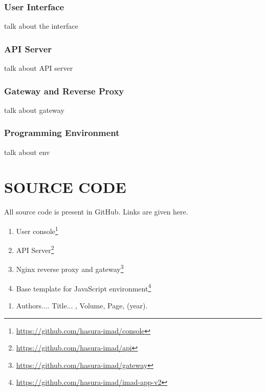 \documentclass[DD]{iitmdiss}
\begin{document}
\subsection{User Interface}
talk about the interface
\subsection{API Server}
talk about API server
\subsection{Gateway and Reverse Proxy}
talk about gateway
\subsection{Programming Environment}
talk about env


\appendix

\chapter{SOURCE CODE}

All source code is present in GitHub. Links are given here.
\begin{enumerate}
	\item User console\footnote{\url{https://github.com/hasura-imad/console}}
	\item API Server\footnote{\url{https://github.com/hasura-imad/api}}
	\item Nginx reverse proxy and gateway\footnote{\url{https://github.com/hasura-imad/gateway}}
	\item Base template for JavaScript environment\footnote{\url{https://github.com/hasura-imad/imad-app-v2}}
\end{enumerate}


\begin{singlespace}
	
\end{singlespace}



\listofpapers

\begin{enumerate}  
\item Authors....  \newblock
 Title...
  , Volume,
  Page, (year).
\end{enumerate}  
\end{document}
